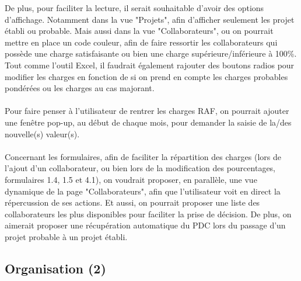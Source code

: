 \documentclass[french]{report}
\begin{document}
De plus, pour faciliter la lecture, il serait souhaitable d’avoir des options
d’affichage. Notamment dans la vue "Projets", afin d'afficher seulement les
projet établi ou probable. Mais aussi dans la vue "Collaborateurs", ou on
pourrait mettre en place un code couleur, afin de faire ressortir les
collaborateurs qui possède une charge satisfaisante ou bien une charge
supérieure/inférieure à 100\%. Tout comme l’outil Excel, il faudrait également rajouter
des boutons radios pour modifier les charges en fonction de si on prend en
compte les charges probables pondérées ou les charges au cas majorant.\\\\ Pour
faire penser à l’utilisateur de rentrer les charges RAF, on pourrait ajouter une
fenêtre pop-up, au début de chaque mois, pour demander la saisie de la/des nouvelle(s)
valeur(s).\\\\ Concernant les formulaires, afin de faciliter la répartition des
charges (lors de l'ajout d'un collaborateur, ou bien lors de la modification
des pourcentages, formulaires 1.4, 1.5 et 4.1), on voudrait proposer, en
parallèle, une vue dynamique de la page "Collaborateurs", afin que l’utilisateur
voit en direct la répercussion de ses actions. Et aussi, on pourrait proposer
une liste des collaborateurs les plus disponibles pour faciliter la prise de
décision. De plus, on aimerait proposer une récupération automatique du PDC lors
du passage d’un projet probable à un projet établi.

\subsection{Organisation (2)}
\end{document}
